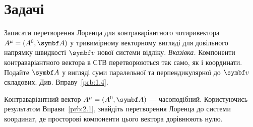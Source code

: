 \documentclass[%
biblatex,
]{ConspectBook}
\begin{document}
\section*{Задачі}


\begin{problem}\label{prb:2.1}%
    Записати перетворення Лоренца для контраваріантного
    чотиривектора $A^\mu = (A^0, \vect{A})$ у тривимірному векторному вигляді для довільного
    напрямку швидкості $\vect{v}$ нової системи відліку.
    \textit{Вказівка.} Компоненти контраваріантного вектора в СТВ
    перетворюються так само, як і координати. Подайте $\vect{A}$ у вигляді
    суми паралельної та перпендикулярної до $\vect{v}$ складових. Див.
    Вправу~\ref{prb:1.4}.
\end{problem}

\begin{problem}%
Контраваріантний вектор $A^\mu = (A^0, \vect{A})$ --- часоподібний.
Користуючись результатом Вправи~\ref{prb:2.1}, знайдіть перетворення Лоренца до
системи координат, де просторові компоненти цього вектора дорівнюють нулю.
\end{problem}
\end{document}
